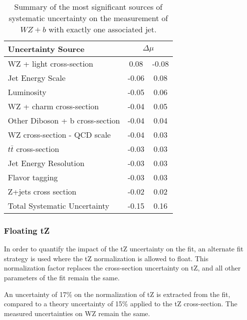 \begin{table}[H]                                                                                                             
    \centering                                                                                                               
    \begin{tabular}{l|cc}
        \hline\hline
        Uncertainty Source & \multicolumn{2}{c}{$\Delta \mu$ }  \\
        \hline
        WZ + light cross-section & 0.08 & -0.08 \\
        Jet Energy Scale & -0.06 & 0.08 \\
        Luminosity & -0.05 & 0.06 \\
        WZ + charm cross-section & -0.04 & 0.05 \\
        Other Diboson + b cross-section & -0.04 & 0.04 \\
        WZ cross-section - QCD scale & -0.04 & 0.03 \\
        $t\bar{t}$ cross-section & -0.03 & 0.03 \\
        Jet Energy Resolution & -0.03 & 0.03 \\
        Flavor tagging & -0.03 & 0.03 \\
        Z+jets cross section & -0.02 & 0.02 \\
        \hline
        Total Systematic Uncertainty & -0.15 & 0.16 \\
        \hline\hline
  \end{tabular}
  \caption{Summary of the most significant sources of systematic uncertainty on the measurement of $WZ+b$ with exactly one associated jet.}
  \label{tab:systematics_tZ1j}
\end{table}

\subsubsection{Floating tZ}
\label{sec:float_tZ}

In order to quantify the impact of the tZ uncertainty on the fit, an alternate fit strategy is used where the tZ normalization is allowed to float. This normalization factor replaces the cross-section uncertainty on tZ, and all other parameters of the fit remain the same.

An uncertainty of 17\% on the normalization of tZ is extracted from the fit, compared to a theory uncertainty of 15\% applied to the tZ cross-section. The measured uncertainties on WZ remain the same.
